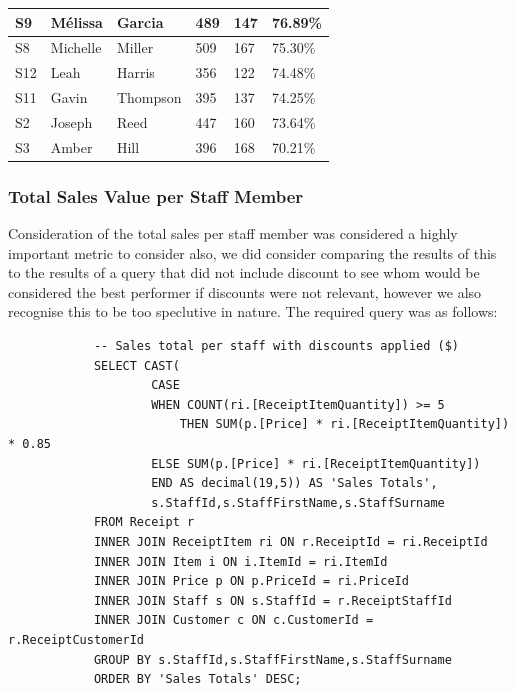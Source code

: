 \documentclass{article}
\begin{document}
\begin{table}[H]
\begin{tabular}{|l|l|l|l|l|l|}
                S9      & Mélissa        & Garcia       & 489              & 147            & 76.89\%            \\ \hline
                S8      & Michelle       & Miller       & 509              & 167            & 75.30\%            \\ \hline
                S12     & Leah           & Harris       & 356              & 122            & 74.48\%            \\ \hline
                S11     & Gavin          & Thompson     & 395              & 137            & 74.25\%            \\ \hline
                S2      & Joseph         & Reed         & 447              & 160            & 73.64\%            \\ \hline
                S3      & Amber          & Hill         & 396              & 168            & 70.21\%            \\ \hline
                \end{tabular}
                \end{table}

            \newpage
            \subsubsection{Total Sales Value per Staff Member}

            Consideration of the total sales per staff member was considered a highly important 
            metric to consider also, we did consider comparing the results of this to the 
            results of a query that did not include discount to see whom would be considered
            the best performer if discounts were not relevant, however we also recognise this to be too
            speclutive in nature. The required query was as follows:

            \begin{lstlisting}
            -- Sales total per staff with discounts applied ($)
            SELECT CAST(
                    CASE
                    WHEN COUNT(ri.[ReceiptItemQuantity]) >= 5
                        THEN SUM(p.[Price] * ri.[ReceiptItemQuantity]) * 0.85
                    ELSE SUM(p.[Price] * ri.[ReceiptItemQuantity])
                    END AS decimal(19,5)) AS 'Sales Totals',
                    s.StaffId,s.StaffFirstName,s.StaffSurname
            FROM Receipt r
            INNER JOIN ReceiptItem ri ON r.ReceiptId = ri.ReceiptId
            INNER JOIN Item i ON i.ItemId = ri.ItemId
            INNER JOIN Price p ON p.PriceId = ri.PriceId
            INNER JOIN Staff s ON s.StaffId = r.ReceiptStaffId
            INNER JOIN Customer c ON c.CustomerId = r.ReceiptCustomerId
            GROUP BY s.StaffId,s.StaffFirstName,s.StaffSurname
            ORDER BY 'Sales Totals' DESC;
            \end{lstlisting}
\end{document}
